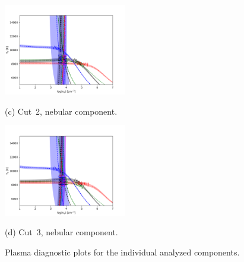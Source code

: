 \documentclass[fleqn,usenatbib]{mnras}
\begin{document}
\begin{figure}
  \begin{minipage}{7.5cm}
   \centering\includegraphics[height=4cm,width=\columnwidth]{neb_cut2.png}
   \centerline{(c) Cut~2, nebular component.}
  \end{minipage}
  \begin{minipage}{7.5cm}
    \centering\includegraphics[height=4cm,width=\columnwidth]{neb_cut3.png}
    \centerline{(d) Cut~3, nebular component.}
  \end{minipage}
  \caption{Plasma diagnostic plots for the individual analyzed components.}
\label{fig:plasma}
\end{figure}




\bsp	%
\label{lastpage}
\end{document}
